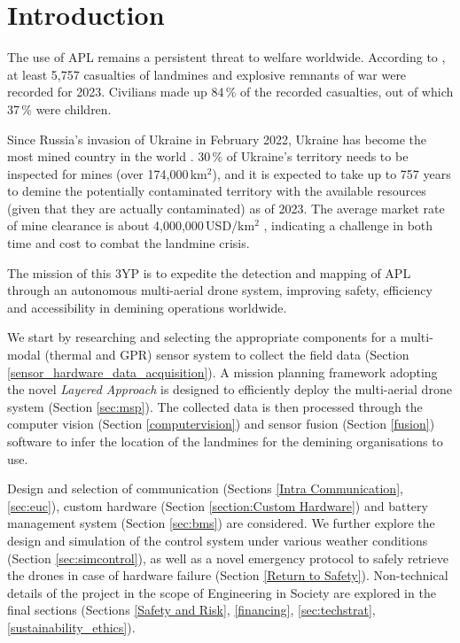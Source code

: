 \section{Introduction} \label{introduction}

The use of \gls{APL} remains a persistent threat to welfare worldwide. According to \cite{icbl2024landmine}, at least 5,757 casualties of landmines and explosive remnants of war were recorded for 2023. Civilians made up 84\,\% of the recorded casualties, out of which 37\,\% were children. 

Since Russia's invasion of Ukraine in February 2022, Ukraine has become the most mined country in the world \cite{globsec2024ukraine}. 30\,\% of Ukraine's territory needs to be inspected for mines (over 174,000\,km$^2$), and it is expected to take up to 757 years to demine the potentially contaminated territory with the available resources (given that they are actually contaminated) as of 2023. The average market rate of mine clearance is about 4,000,000\,USD/km$^2$ \cite{globsec2023ukraine}, indicating a challenge in both time and cost to combat the landmine crisis. 

The mission of this \gls{3YP} is to expedite the detection and mapping of \gls{APL} through an autonomous multi-aerial drone system, improving safety, efficiency and accessibility in demining operations worldwide. 










We start by researching and selecting the appropriate components for a multi-modal (thermal and \gls{GPR}) sensor system to collect the field data (Section \ref{sensor_hardware_data_acquisition}). A mission planning framework adopting the novel \textit{Layered Approach} is designed to efficiently deploy the multi-aerial drone system (Section \ref{sec:msp}). The collected data is then processed through the computer vision (Section \ref{computervision}) and sensor fusion (Section \ref{fusion}) software to infer the location of the landmines for the demining organisations to use. 

Design and selection of communication (Sections \ref{Intra Communication}, \ref{sec:euc}), custom hardware (Section \ref{section:Custom Hardware}) and battery management system (Section \ref{sec:bms}) are considered. We further explore the design and simulation of the control system under various weather conditions (Section \ref{sec:simcontrol}), as well as a novel emergency protocol to safely retrieve the drones in case of hardware failure (Section \ref{Return to Safety}). Non-technical details of the project in the scope of Engineering in Society are explored in the final sections (Sections \ref{Safety and Risk}, \ref{financing}, \ref{sec:techstrat}, \ref{sustainability_ethics}). 

